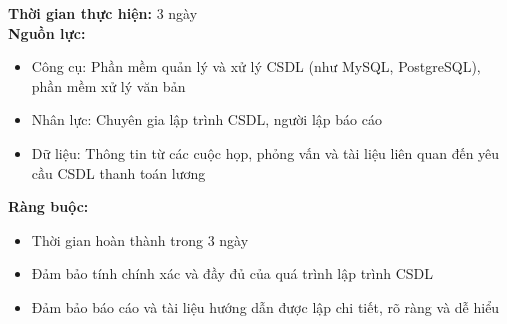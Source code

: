 {\begin{minipage}{\textwidth}
\begin{itemize}
    \end{itemize}
    \noindent \textbf{Thời gian thực hiện:} 3 ngày \\
    \noindent \textbf{Nguồn lực:}
    \begin{itemize}
        \item Công cụ: Phần mềm quản lý và xử lý CSDL (như MySQL, PostgreSQL), phần mềm xử lý văn bản
        \item Nhân lực: Chuyên gia lập trình CSDL, người lập báo cáo
        \item Dữ liệu: Thông tin từ các cuộc họp, phỏng vấn và tài liệu liên quan đến yêu cầu CSDL thanh toán lương
    \end{itemize}
    \noindent \textbf{Ràng buộc:}
    \begin{itemize}
        \item Thời gian hoàn thành trong 3 ngày
        \item Đảm bảo tính chính xác và đầy đủ của quá trình lập trình CSDL
        \item Đảm bảo báo cáo và tài liệu hướng dẫn được lập chi tiết, rõ ràng và dễ hiểu
    \end{itemize}
    \end{minipage}
}
\newpage
{}    
